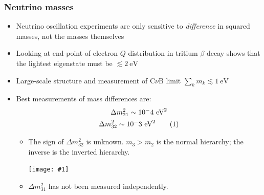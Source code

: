 \documentclass[11pt]{article}
\newcommand\numberthis{\addtocounter{equation}{1}\tag{\theequation}}
\newcommand{\ev}{\text{eV}}
\newcommand{\embedimgw}[2]{\begin{center}\texttt{[image: \#1]}\end{center}}
\begin{document}
\subsubsection{Neutrino masses}
\begin{itemize}
  \item Neutrino oscillation experiments are only sensitive to \emph{difference} in squared masses, not the masses themselves
  \item Looking at end-point of electron $Q$ distribution in tritium $\beta$-decay shows that the lightest eigenstate must be $\lesssim 2~\ev$
  \item Large-scale structure and measurement of C$\nu$B limit $\sum_k m_{k} \lesssim 1~\ev$
  \item Best measurements of mass differences are:
  \begin{gather*}
    \Delta m_{21}^2 \sim 10^-4~\ev^2\\
    \Delta m_{32}^2 \sim 10^-3~\ev^2\numberthis
  \end{gather*}
  \begin{itemize}
    \item The sign of $\Delta m_{32}^2$ is unknown. $m_3>m_2$ is the normal hierarchy; the inverse is the inverted hierarchy.
    \embedimgw{figs/nuhierarchy.png}{.6}
    \item $\Delta m_{31}^2$ has not been measured independently.
  \end{itemize}
\end{itemize}
\end{document}
